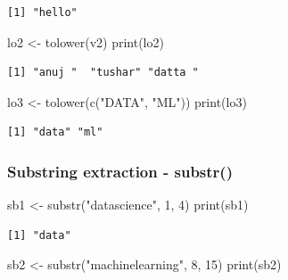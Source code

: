 \documentclass[
  letterpaper,
  DIV=11,
  numbers=noendperiod]{scrartcl}
\newenvironment{Shaded}{\begin{snugshade}}{\end{snugshade}}
\newcommand{\DecValTok}[1]{\textcolor[rgb]{0.68,0.00,0.00}{#1}}
\newcommand{\FunctionTok}[1]{\textcolor[rgb]{0.28,0.35,0.67}{#1}}
\newcommand{\NormalTok}[1]{\textcolor[rgb]{0.00,0.23,0.31}{#1}}
\newcommand{\OtherTok}[1]{\textcolor[rgb]{0.00,0.23,0.31}{#1}}
\newcommand{\StringTok}[1]{\textcolor[rgb]{0.13,0.47,0.30}{#1}}
\begin{document}
\begin{verbatim}
[1] "hello"
\end{verbatim}

\begin{Shaded}
\begin{Highlighting}[]
\NormalTok{lo2 }\OtherTok{\textless{}{-}} \FunctionTok{tolower}\NormalTok{(v2)}
\FunctionTok{print}\NormalTok{(lo2)}
\end{Highlighting}
\end{Shaded}

\begin{verbatim}
[1] "anuj "  "tushar" "datta "
\end{verbatim}

\begin{Shaded}
\begin{Highlighting}[]
\NormalTok{lo3 }\OtherTok{\textless{}{-}} \FunctionTok{tolower}\NormalTok{(}\FunctionTok{c}\NormalTok{(}\StringTok{"DATA"}\NormalTok{, }\StringTok{"ML"}\NormalTok{))}
\FunctionTok{print}\NormalTok{(lo3)}
\end{Highlighting}
\end{Shaded}

\begin{verbatim}
[1] "data" "ml"  
\end{verbatim}

\subsubsection{Substring extraction -
substr()}\label{substring-extraction---substr}

\begin{Shaded}
\begin{Highlighting}[]
\NormalTok{sb1 }\OtherTok{\textless{}{-}} \FunctionTok{substr}\NormalTok{(}\StringTok{"datascience"}\NormalTok{, }\DecValTok{1}\NormalTok{, }\DecValTok{4}\NormalTok{)}
\FunctionTok{print}\NormalTok{(sb1)}
\end{Highlighting}
\end{Shaded}

\begin{verbatim}
[1] "data"
\end{verbatim}

\begin{Shaded}
\begin{Highlighting}[]
\NormalTok{sb2 }\OtherTok{\textless{}{-}} \FunctionTok{substr}\NormalTok{(}\StringTok{"machinelearning"}\NormalTok{, }\DecValTok{8}\NormalTok{, }\DecValTok{15}\NormalTok{)}
\FunctionTok{print}\NormalTok{(sb2)}
\end{Highlighting}
\end{Shaded}
\end{document}
